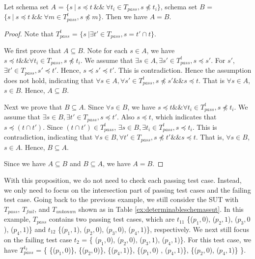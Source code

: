 \begin{proposition}\label{pro:healthysintequal}
Let schema set $A$ = $\{ s\ |\ s \preceq t\ \&\&\  \forall t_{i} \in T_{pass}, s \npreceq t_{i} \} $,  schema set $B$ = $\{ s\ |\ s \preceq t\ \&\&\ \forall m \in T_{pass}^{t}, s \npreceq m \}$. Then we have $A = B$.
\end{proposition}

\begin{proof}
Note that $T_{pass}^{t}$ = $\{ s\ |\exists t' \in T_{pass}, s =  t' \cap t \}$.

We first prove that $A \subseteq B$. Note for each $s \in A$, we have $s \preceq t \&\& \forall t_{i} \in T_{pass}, s \npreceq t_{i}$. We assume that $\exists s \in A, \exists s' \in T_{pass}^{t}, s \preceq s'$. For $s'$, $\exists t' \in T_{pass}, s' \preceq t'$. Hence, $s  \preceq s' \preceq t'$. This is contradiction. Hence the assumption does not hold, indicating that $\forall s \in A, \forall s' \in T_{pass}^{t}, s \npreceq s' \&\& s \preceq t$. That is $\forall s \in A$, $s \in B$. Hence, $A \subseteq B$.

Next we prove that $B \subseteq A$. Since $\forall s \in B$, we have $s \preceq t \&\& \forall t_{i} \in  T_{pass}^{t}, s \npreceq t_{i}$. We assume that $\exists s \in B, \exists t' \in T_{pass}, s \preceq t'$. Also $s \preceq t$, which indicates that $s \preceq (t \cap t')$.  Since $(t \cap t') \in T_{pass}^{t} $, $\exists s \in B, \exists t_{i} \in T_{pass}^{t}, s \preceq t_{i}$. This is contradiction, indicating that  $\forall s \in B, \forall t' \in T_{pass}, s \npreceq t' \&\& s \preceq t$. That is, $\forall s \in B$, $s \in A$. Hence, $B \subseteq A$.

Since we have $A \subseteq B$ and $B \subseteq A$, we have $A = B$.
\end{proof}

With this proposition, we do not need to check each passing test case. Instead, we only need to focus on the intersection part of passing test cases and the failing test case.  Going back to the previous example,  we still consider the SUT with $T_{pass}$, $T_{fail}$, and $T_{unkonwn}$ shown as in Table \ref{ex:determinableschemassut}. In this example, $T_{pass}$ contains two passing test cases, which are  $t_{11}$ \{($p_{1}, 0$), ($p_{2}, 1$), ($p_{3}, 0$), ($p_{4}, 1$)\} and  $t_{12}$  \{($p_{1}, 1$), ($p_{2}, 0$), ($p_{3}, 0$), ($p_{4}, 1$)\}, respectively. We next still focus on the failing test case $t_{2}$ =  \{ ($p_{1}, 0$), ($p_{2}, 0$), ($p_{3}, 1$), ($p_{4}, 1$)\}. For this test case, we have $T_{pass}^{t_{2}}$ = \{ \{($p_{1}, 0$)\}, \{($p_{2}, 0$)\},  \{($p_{4}, 1$)\}, \{($p_{1}, 0$) , ($p_{4}, 1$)\}, \{($p_{2}, 0$), ($p_{4}, 1$)\} \}.

